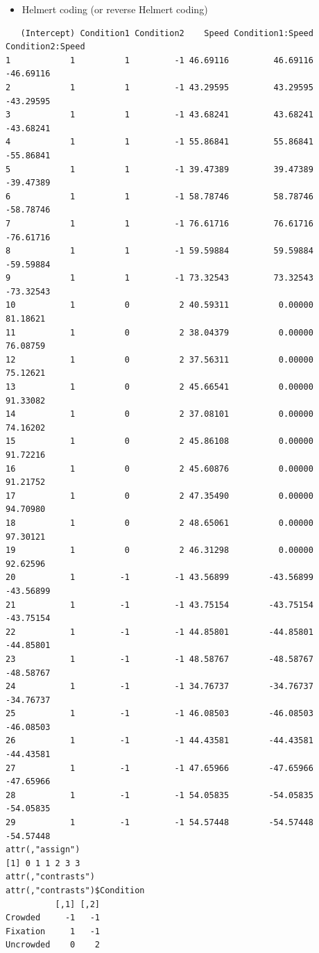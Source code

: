 \documentclass[
]{article}
\providecommand{\tightlist}{%
  \setlength{\itemsep}{0pt}\setlength{\parskip}{0pt}}
\begin{document}
\normalsize

\begin{itemize}
\tightlist
\item
  Helmert coding (or reverse Helmert coding)
\end{itemize}

\footnotesize

\begin{verbatim}
   (Intercept) Condition1 Condition2    Speed Condition1:Speed Condition2:Speed
1            1          1         -1 46.69116         46.69116        -46.69116
2            1          1         -1 43.29595         43.29595        -43.29595
3            1          1         -1 43.68241         43.68241        -43.68241
4            1          1         -1 55.86841         55.86841        -55.86841
5            1          1         -1 39.47389         39.47389        -39.47389
6            1          1         -1 58.78746         58.78746        -58.78746
7            1          1         -1 76.61716         76.61716        -76.61716
8            1          1         -1 59.59884         59.59884        -59.59884
9            1          1         -1 73.32543         73.32543        -73.32543
10           1          0          2 40.59311          0.00000         81.18621
11           1          0          2 38.04379          0.00000         76.08759
12           1          0          2 37.56311          0.00000         75.12621
13           1          0          2 45.66541          0.00000         91.33082
14           1          0          2 37.08101          0.00000         74.16202
15           1          0          2 45.86108          0.00000         91.72216
16           1          0          2 45.60876          0.00000         91.21752
17           1          0          2 47.35490          0.00000         94.70980
18           1          0          2 48.65061          0.00000         97.30121
19           1          0          2 46.31298          0.00000         92.62596
20           1         -1         -1 43.56899        -43.56899        -43.56899
21           1         -1         -1 43.75154        -43.75154        -43.75154
22           1         -1         -1 44.85801        -44.85801        -44.85801
23           1         -1         -1 48.58767        -48.58767        -48.58767
24           1         -1         -1 34.76737        -34.76737        -34.76737
25           1         -1         -1 46.08503        -46.08503        -46.08503
26           1         -1         -1 44.43581        -44.43581        -44.43581
27           1         -1         -1 47.65966        -47.65966        -47.65966
28           1         -1         -1 54.05835        -54.05835        -54.05835
29           1         -1         -1 54.57448        -54.57448        -54.57448
attr(,"assign")
[1] 0 1 1 2 3 3
attr(,"contrasts")
attr(,"contrasts")$Condition
          [,1] [,2]
Crowded     -1   -1
Fixation     1   -1
Uncrowded    0    2
\end{verbatim}
\end{document}
